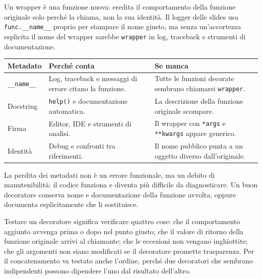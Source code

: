 \documentclass[12pt]{extarticle}
\begin{document}
\noindent Un wrapper è una funzione nuova: eredita il comportamento della funzione originale solo perché la chiama, non la sua identità. Il logger delle slides usa \texttt{func.\_\_name\_\_} proprio per stampare il nome giusto, ma senza un'accortezza esplicita il nome del wrapper sarebbe \texttt{wrapper} in log, traceback e strumenti di documentazione.

\begin{center}
\small
\begin{tabular}{p{4.0cm}p{5.2cm}p{5.2cm}}
    \toprule
    \textbf{Metadato} & \textbf{Perché conta} & \textbf{Se manca} \\
    \midrule
    \texttt{\_\_name\_\_} & Log, traceback e messaggi di errore citano la funzione. & Tutte le funzioni decorate sembrano chiamarsi \texttt{wrapper}. \\
    \addlinespace
    Docstring & \texttt{help()} e documentazione automatica. & La descrizione della funzione originale scompare. \\
    \addlinespace
    Firma & Editor, IDE e strumenti di analisi. & Il wrapper con \texttt{*args} e \texttt{**kwargs} appare generico. \\
    \addlinespace
    Identità & Debug e confronti tra riferimenti. & Il nome pubblico punta a un oggetto diverso dall'originale. \\
    \bottomrule
\end{tabular}
\end{center}

\noindent La perdita dei metadati non è un errore funzionale, ma un debito di manutenibilità: il codice funziona e diventa più difficile da diagnosticare. Un buon decoratore conserva nome e documentazione della funzione avvolta, oppure documenta esplicitamente che li sostituisce.

\noindent Testare un decoratore significa verificare quattro cose: che il comportamento aggiunto avvenga prima o dopo nel punto giusto; che il valore di ritorno della funzione originale arrivi al chiamante; che le eccezioni non vengano inghiottite; che gli argomenti non siano modificati se il decoratore promette trasparenza. Per il concatenamento va testato anche l'ordine, perché due decoratori che sembrano indipendenti possono dipendere l'uno dal risultato dell'altro.
\end{document}
